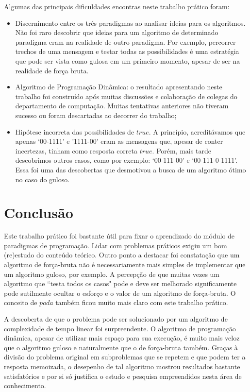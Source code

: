 \documentclass[a4paper,12pt,titlepage]{article}
\begin{document}
Algumas das principais dificuldades encontras neste trabalho prático foram: 
\begin{itemize}[leftmargin=1.5cm]
    \item Discernimento entre os três paradigmas ao analisar ideias para os algoritmos. Não foi raro descobrir que ideias para um algoritmo de determinado paradigma eram na realidade de outro paradigma. Por exemplo, percorrer trechos de uma mensagem e testar todas as possibilidades é uma estratégia que pode ser vista como gulosa em um primeiro momento, apesar de ser na realidade de força bruta.
    \item Algoritmo de Programação Dinâmica: o resultado apresentando neste trabalho foi construído após muitas discussões e colaboração de colegas do departamento de computação. Muitas tentativas anteriores não tiveram sucesso ou foram descartadas ao decorrer do trabalho;
    \item Hipótese incorreta das possibilidades de $true$. A princípio, acreditávamos que apenas `00-1111' e '1111-00' eram as mensagens que, apesar de conter incertezas, tinham como resposta correta $true$. Porém, mais tarde descobrimos outros casos, como por exemplo: `00-111-00' e `00-111-0-1111'. Essa foi uma das descobertas que desmotivou a busca de um algoritmo ótimo no caso do guloso.
    \ \\
\end{itemize}


\section{Conclusão}
Este trabalho prático foi bastante útil para fixar o aprendizado do módulo de paradigmas de programação. Lidar com problemas práticos exigiu um bom (re)estudo do conteúdo teórico. Outro ponto a destacar foi constatação que um algoritmo de força-bruta não é necessariamente mais simples de implementar que um algoritmo guloso, por exemplo. A percepção de que muitas vezes um algoritmo que ``testa todos os casos" pode e deve ser melhorado significamente pode sutilmente ocultar o esforço e o valor de um algoritmo de força-bruta. O conceito de $poda$ também ficou muito mais claro com este trabalho prático.

A descoberta de que o problema pode ser solucionado por um algoritmo de complexidade de tempo linear foi surpreendente. O algoritmo de programação dinâmica, apesar de utilizar mais espaço para sua execução, é muito mais veloz que o algoritmo guloso e naturalmente que o de força-bruta também. Graças à divisão do problema original em subproblemas que se repetem e que podem ter a resposta memoizada, o desepenho de tal algoritmo mostrou resultados bastante satisfatórios e por si só justifica o estudo e pesquisa empreendidos nesta área de conhecimento.

\begin{figure}[H]
     \centering
     \caption{}
     \label{bsp}
\end{figure}



\newpage
\end{document}
